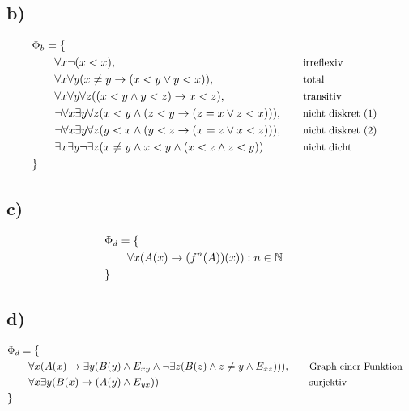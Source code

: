 \documentclass[11pt, a4paper]{article}
\renewcommand{\v}{\vee}
\newcommand{\n}{\wedge}
\begin{document}
\subsection*{b)}
\[\begin{aligned}
    &\Phi_b = \{ \\
        &\qquad \forall x \neg (x < x), &&\quad \text{\small{irreflexiv}} \\
        &\qquad \forall x \forall y (x \neq y \rightarrow (x < y \v y < x)), &&\quad \text{\small{total}} \\
        &\qquad \forall x \forall y \forall z ((x < y \n y < z) \rightarrow x < z), &&\quad \text{\small{transitiv}} \\
        &\qquad \neg \forall x \exists y \forall z (x<y \n (z<y \rightarrow (z = x \v z < x))), &&\quad \text{\small{nicht diskret (1)}} \\
        &\qquad \neg \forall x \exists y \forall z (y<x \n (y<z \rightarrow (x = z \v x < z))), &&\quad \text{\small{nicht diskret (2)}} \\
        &\qquad \exists x \exists y \neg \exists z (x \neq y \n x < y \n (x < z \n z < y)) &&\quad \text{\small{nicht dicht}} \\
    &\}
\end{aligned}\]

\subsection*{c)}
\[\begin{aligned}
    &\Phi_d = \{ \\
        &\qquad \forall x (A(x) \rightarrow (f^n(A))(x)) : n \in \mathbb{N} &&\quad \text{\small{}} \\
    &\}
\end{aligned}\]


\subsection*{d)}
\[\begin{aligned}
    &\Phi_d = \{ \\
        &\qquad \forall x (A(x) \rightarrow \exists y (B(y) \n E_{xy} \n \neg\exists z (B(z) \n z \neq y \n E_{xz}))), &&\quad \text{\small{Graph einer Funktion}} \\
        &\qquad \forall x \exists y (B(x) \rightarrow (A(y) \n E_{yx})) &&\quad \text{\small{surjektiv}} \\
    &\}
\end{aligned}\]
\end{document}
